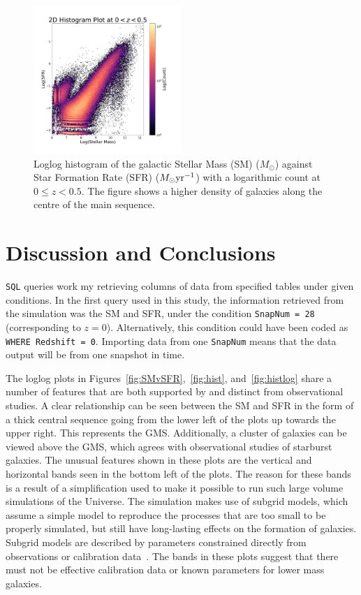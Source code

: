 \documentclass[12pt]{article}
\begin{document}
\begin{figure}[htbp]
  \centerline{\includegraphics[width=0.5\textwidth]{histlog2.pdf}}
    \caption{Loglog histogram of the galactic Stellar Mass (SM) ($M_\odot$) against Star Formation Rate (SFR) ($M_\odot\rm{yr}^{-1}$) with a logarithmic count at $0\leq z < 0.5$.  The figure shows a higher density of galaxies along the centre of the main sequence.}
    \label{fig:histlog2}
\end{figure}

\section{Discussion and Conclusions}
{\tt SQL} queries work my retrieving columns of data from specified tables under given conditions.  In the first query used in this study, the information retrieved from the simulation was the SM and SFR, under the condition {\tt SnapNum = 28} (corresponding to $z=0$). Alternatively, this condition could have been coded as {\tt WHERE Redshift = 0}.  Importing data from one {\tt SnapNum} means that the data output will be from one snapshot in time.  

The loglog plots in Figures~\ref{fig:SMvSFR},~\ref{fig:hist}, and~\ref{fig:histlog} share a number of features that are both supported by and distinct from observational studies.  A clear relationship can be seen between the SM and SFR in the form of a thick central sequence going from the lower left of the plots up towards the upper right.  This represents the GMS.  Additionally, a cluster of galaxies can be viewed above the GMS, which agrees with observational studies of starburst galaxies.  The unusual features shown in these plots are the vertical and horizontal bands seen in the bottom left of the plots.  The reason for these bands is a result of a simplification used to make it possible to run such large volume simulations of the Universe.  The simulation makes use of subgrid models, which assume a simple model to reproduce the processes that are too small to be properly simulated, but still have long-lasting effects on the formation of galaxies. Subgrid models are described by parameters constrained directly from observations or calibration data~\cite{sim}.  The bands in these plots suggest that there must not be effective calibration data or known parameters for lower mass galaxies. 
\end{document}
